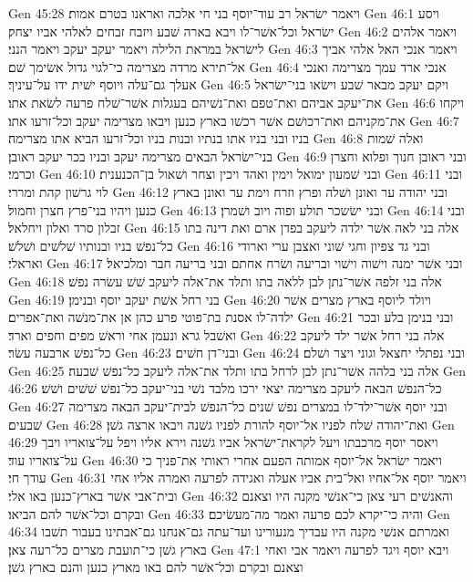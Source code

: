 Gen 45:28  ויאמר ישׂראל רב עוד־יוסף בני חי אלכה ואראנו בטרם אמות׃
Gen 46:1  ויסע ישׂראל וכל־אשׁר־לו ויבא בארה שׁבע ויזבח זבחים לאלהי אביו יצחק׃
Gen 46:2  ויאמר אלהים לישׂראל במראת הלילה ויאמר יעקב יעקב ויאמר הנני׃
Gen 46:3  ויאמר אנכי האל אלהי אביך אל־תירא מרדה מצרימה כי־לגוי גדול אשׂימך שׁם׃
Gen 46:4  אנכי ארד עמך מצרימה ואנכי אעלך גם־עלה ויוסף ישׁית ידו על־עיניך׃
Gen 46:5  ויקם יעקב מבאר שׁבע וישׂאו בני־ישׂראל את־יעקב אביהם ואת־טפם ואת־נשׁיהם בעגלות אשׁר־שׁלח פרעה לשׂאת אתו׃
Gen 46:6  ויקחו את־מקניהם ואת־רכושׁם אשׁר רכשׁו בארץ כנען ויבאו מצרימה יעקב וכל־זרעו אתו׃
Gen 46:7  בניו ובני בניו אתו בנתיו ובנות בניו וכל־זרעו הביא אתו מצרימה׃
Gen 46:8  ואלה שׁמות בני־ישׂראל הבאים מצרימה יעקב ובניו בכר יעקב ראובן׃
Gen 46:9  ובני ראובן חנוך ופלוא וחצרן וכרמי׃
Gen 46:10  ובני שׁמעון ימואל וימין ואהד ויכין וצחר ושׁאול בן־הכנענית׃
Gen 46:11  ובני לוי גרשׁון קהת ומררי׃
Gen 46:12  ובני יהודה ער ואונן ושׁלה ופרץ וזרח וימת ער ואונן בארץ כנען ויהיו בני־פרץ חצרן וחמול׃
Gen 46:13  ובני ישׂשכר תולע ופוה ויוב ושׁמרן׃
Gen 46:14  ובני זבלון סרד ואלון ויחלאל׃
Gen 46:15  אלה בני לאה אשׁר ילדה ליעקב בפדן ארם ואת דינה בתו כל־נפשׁ בניו ובנותיו שׁלשׁים ושׁלשׁ׃
Gen 46:16  ובני גד צפיון וחגי שׁוני ואצבן ערי וארודי ואראלי׃
Gen 46:17  ובני אשׁר ימנה וישׁוה וישׁוי ובריעה ושׂרח אחתם ובני בריעה חבר ומלכיאל׃
Gen 46:18  אלה בני זלפה אשׁר־נתן לבן ללאה בתו ותלד את־אלה ליעקב שׁשׁ עשׂרה נפשׁ׃
Gen 46:19  בני רחל אשׁת יעקב יוסף ובנימן׃
Gen 46:20  ויולד ליוסף בארץ מצרים אשׁר ילדה־לו אסנת בת־פוטי פרע כהן אן את־מנשׁה ואת־אפרים׃
Gen 46:21  ובני בנימן בלע ובכר ואשׁבל גרא ונעמן אחי וראשׁ מפים וחפים וארד׃
Gen 46:22  אלה בני רחל אשׁר ילד ליעקב כל־נפשׁ ארבעה עשׂר׃
Gen 46:23  ובני־דן חשׁים׃
Gen 46:24  ובני נפתלי יחצאל וגוני ויצר ושׁלם׃
Gen 46:25  אלה בני בלהה אשׁר־נתן לבן לרחל בתו ותלד את־אלה ליעקב כל־נפשׁ שׁבעה׃
Gen 46:26  כל־הנפשׁ הבאה ליעקב מצרימה יצאי ירכו מלבד נשׁי בני־יעקב כל־נפשׁ שׁשׁים ושׁשׁ׃
Gen 46:27  ובני יוסף אשׁר־ילד־לו במצרים נפשׁ שׁנים כל־הנפשׁ לבית־יעקב הבאה מצרימה שׁבעים׃
Gen 46:28  ואת־יהודה שׁלח לפניו אל־יוסף להורת לפניו גשׁנה ויבאו ארצה גשׁן׃
Gen 46:29  ויאסר יוסף מרכבתו ויעל לקראת־ישׂראל אביו גשׁנה וירא אליו ויפל על־צואריו ויבך על־צואריו עוד׃
Gen 46:30  ויאמר ישׂראל אל־יוסף אמותה הפעם אחרי ראותי את־פניך כי עודך חי׃
Gen 46:31  ויאמר יוסף אל־אחיו ואל־בית אביו אעלה ואגידה לפרעה ואמרה אליו אחי ובית־אבי אשׁר בארץ־כנען באו אלי׃
Gen 46:32  והאנשׁים רעי צאן כי־אנשׁי מקנה היו וצאנם ובקרם וכל־אשׁר להם הביאו׃
Gen 46:33  והיה כי־יקרא לכם פרעה ואמר מה־מעשׂיכם׃
Gen 46:34  ואמרתם אנשׁי מקנה היו עבדיך מנעורינו ועד־עתה גם־אנחנו גם־אבתינו בעבור תשׁבו בארץ גשׁן כי־תועבת מצרים כל־רעה צאן׃
Gen 47:1  ויבא יוסף ויגד לפרעה ויאמר אבי ואחי וצאנם ובקרם וכל־אשׁר להם באו מארץ כנען והנם בארץ גשׁן׃
